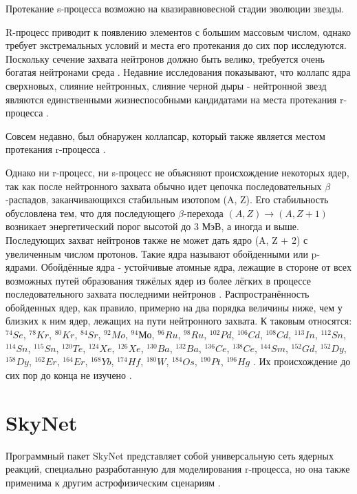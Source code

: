 \documentclass[14pt, a4paper]{article}
\begin{document}
 Протекание s-процесса возможно на квазиравновесной стадии эволюции звезды.
 
 R-процесс приводит к появлению элементов с большим массовым числом, однако требует экстремальных условий и места его протекания до сих пор исследуются. Поскольку сечение захвата нейтронов должно быть велико, требуется очень богатая нейтронами среда \cite{places}. Недавние исследования показывают, что коллапс ядра сверхновых, слияние нейтронных, слияние черной дыры - нейтронной звезд являются единственными жизнеспособными кандидатами на места протекания r-процесса \cite{sites, neutrino, nsns, bhns1}. 
 
 Совсем недавно, был обнаружен коллапсар, который также является местом протекания r-процесса \cite{collapsars}.
 
Однако ни r-процесс, ни s-процесс не объясняют происхождение некоторых ядер, так как после нейтронного захвата обычно идет цепочка последовательных $\beta$-распадов, заканчивающихся стабильным изотопом (A, Z). Его стабильность обусловлена тем, что для последующего $\beta$-перехода $(A, Z) \rightarrow (A, Z + 1)$ возникает энергетический порог высотой до 3 МэВ, а иногда и выше. Последующих захват нейтронов также не может дать ядро (A, Z + 2) с увеличенным числом протонов. Такие ядра называют обойденными или p-ядрами. Обойдённые ядра - устойчивые атомные ядра, лежащие в стороне от всех возможных путей образования тяжёлых ядер из более лёгких в процессе последовательного захвата последними нейтронов \cite{reactions}. Распространённость обойденных ядер, как правило, примерно на два порядка величины ниже, чем у близких к ним ядер, лежащих на пути нейтронного захвата. К таковым относятся: $^{74}Se$, $^{78}Kr$, $^{80}Kr$, $^{84}Sr$, $^{92}Mo$, $^{94}Мо$, $^{96}Ru$, $^{98}Ru$, $^{102}Pd$, $^{106}Cd$, $^{108}Cd$, $^{113}In$, $^{112}Sn$, $^{114}Sn$, $^{115}Sn$, $^{120}Te$, $^{124}Xe$, $^{126}Xe$, $^{130}Ba$, $^{132}Ba$, $^{136}Ce$, $^{138}Ce$, $^{144}Sm$, $^{152}Gd$, $^{152}Dy$, $^{158}Dy$, $^{162}Er$, $^{164}Er$, $^{168}Yb$, $^{174}Hf$, $^{180}W$, $^{184}Os$, $^{190}Pt$, $^{196}Hg$ \cite{role}. Их происхождение до сих пор до конца не изучено \cite{p-process}.

\section{SkyNet}

Программный пакет SkyNet представляет собой универсальную сеть ядерных реакций, специально разработанную для моделирования r-процесса, но она также применима к другим астрофизическим сценариям \cite{skynet}.
\end{document}
